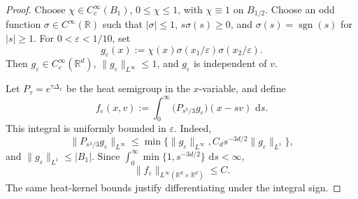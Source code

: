 \documentclass[10pt,a4paper]{amsart}
\numberwithin{equation}{section}
\newcommand{\R}{\mathbb{R}}
\newcommand{\dd}{\,\mathrm{d}}
\begin{document}
\begin{proof}
Choose \(\chi\in C_c^\infty(B_1)\), \(0\le\chi\le1\), with
\(\chi\equiv1\) on \(B_{1/2}\).  Choose an odd function
\(\sigma\in C^\infty(\R)\) such that \(|\sigma|\le1\),
\(s\sigma(s)\ge0\), and \(\sigma(s)=\operatorname{sgn}(s)\) for
\(|s|\ge1\).  For \(0<\varepsilon<1/10\), set
\begin{equation}\label{eq:g-eps-def}
   g_\varepsilon(x)
   :=\chi(x)\sigma(x_1/\varepsilon)\sigma(x_2/\varepsilon).
\end{equation}
Then \(g_\varepsilon\in C_c^\infty(\R^d)\), \(\|g_\varepsilon\|_{L^\infty}\le1\),
and \(g_\varepsilon\) is independent of \(v\).

Let \(P_\tau=e^{\tau\Delta_x}\) be the heat semigroup in the \(x\)-variable,
and define
\begin{equation}\label{eq:f-eps-resolvent}
   f_\varepsilon(x,v)
   :=\int_0^\infty
      \big(P_{s^3/3}g_\varepsilon\big)(x-sv)\,\dd s.
\end{equation}
This integral is uniformly bounded in \(\varepsilon\).  Indeed,
\[
   \|P_{s^3/3}g_\varepsilon\|_{L^\infty}
   \le
   \min\big\{\|g_\varepsilon\|_{L^\infty},
          C_d s^{-3d/2}\|g_\varepsilon\|_{L^1}\big\},
\]
and \(\|g_\varepsilon\|_{L^1}\le |B_1|\).  Since
\(\int_0^\infty \min\{1,s^{-3d/2}\}\,\dd s<\infty\),
\[
   \|f_\varepsilon\|_{L^\infty(\R^d\times\R^d)}\le C.
\]
The same heat-kernel bounds justify differentiating under the integral sign.


\end{proof}
\end{document}
